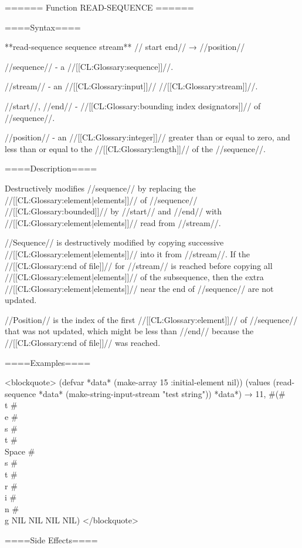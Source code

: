 ====== Function READ-SEQUENCE ======

====Syntax====

**{read-sequence} {sequence stream** //\key} start end// → //position//

//sequence// - a //[[CL:Glossary:sequence]]//.

//stream// - an //[[CL:Glossary:input]]// //[[CL:Glossary:stream]]//.

//start//, //end// - //[[CL:Glossary:bounding index designators]]// of //sequence//. 

//position// - an //[[CL:Glossary:integer]]// greater than or equal to zero, and less than or equal to the //[[CL:Glossary:length]]// of the //sequence//.

====Description====

Destructively modifies //sequence// by replacing the //[[CL:Glossary:element|elements]]// of //sequence// //[[CL:Glossary:bounded]]// by //start// and //end// with //[[CL:Glossary:element|elements]]// read from //stream//.

//Sequence// is destructively modified by copying successive //[[CL:Glossary:element|elements]]// into it from //stream//. If the //[[CL:Glossary:end of file]]// for //stream// is reached before copying all //[[CL:Glossary:element|elements]]// of the subsequence, then the extra //[[CL:Glossary:element|elements]]// near the end of //sequence// are not updated.

//Position// is the index of the first //[[CL:Glossary:element]]// of //sequence// that was not updated, which might be less than //end// because the //[[CL:Glossary:end of file]]// was reached.

====Examples====

<blockquote> (defvar *data* (make-array 15 :initial-element nil)) (values (read-sequence *data* (make-string-input-stream "test string")) *data*) → 11, #(#\\t #\\e #\\s #\\t #\\Space #\\s #\\t #\\r #\\i #\\n #\\g NIL NIL NIL NIL) </blockquote>

====Side Effects====

